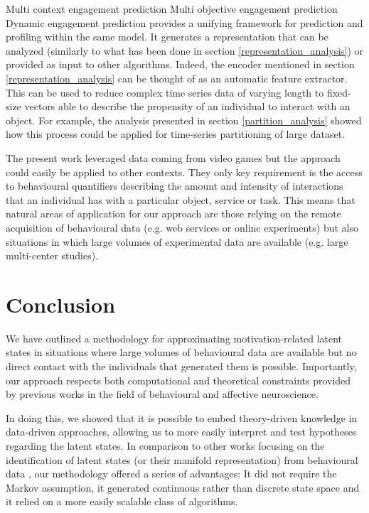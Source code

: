 Multi context engagement prediction
Multi objective engagement prediction
Dynamic engagement prediction
provides a unifying framework for prediction and profiling within the same model.
It generates a representation that can be analyzed (similarly to what has been done in section \ref{representation_analysis}) or provided as input to other algorithms. Indeed, the encoder mentioned in section \ref{representation_analysis} can be thought of as an automatic feature extractor. This can be used to reduce complex time series data of varying length to fixed-size vectors able to describe the propensity of an individual to interact with an object. For example, the analysis presented in section \ref{partition_analysis} showed how this process could be applied for time-series partitioning of large dataset.

The present work leveraged data coming from video games but the approach could easily be applied to other contexts. They only key requirement is the access to behavioural quantifiers describing the amount and intensity of interactions that an individual has with a particular object, service or task. This means that natural areas of application for our approach are those relying on the remote acquisition of behavioural data (e.g. web services or online experiments) but also situations in which large volumes of experimental data are available (e.g. large multi-center studies). 

\section{Conclusion}
\label{conclusions}
We have outlined a methodology for approximating motivation-related latent states in situations where large volumes of behavioural data are available but no direct contact with the individuals that generated them is possible. Importantly, our approach  respects both computational and theoretical constraints provided by previous works in the field of behavioural and affective neuroscience. 

In doing this, we showed that it is possible to embed theory-driven knowledge in data-driven approaches, allowing us to more easily interpret and test hypotheses regarding the latent states. In comparison to other works focusing on the identification of latent states (or their manifold representation) from behavioural data \cite{calhoun2019unsupervised, luxem2020identifying, pereira2020quantifying, shi2021learning, mccullough2021unsupervised}, our methodology offered a series of advantages: It did not require the Markov assumption, it generated continuous rather than discrete state space and it relied on a more easily scalable class of algorithms. 

